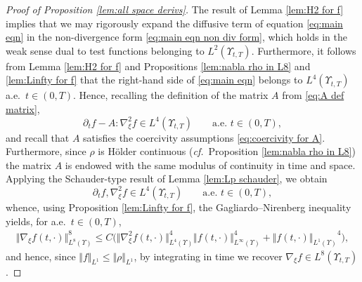 \documentclass[11pt,a4paper,reqno]{amsart}
\theoremstyle{remark}
\theoremstyle{definition}
\numberwithin{equation}{section}
\newcommand{\bxi}{\xi}
\begin{document}
\begin{proof}[Proof of Proposition \ref{lem:all space derivs}]




  The result of Lemma \ref{lem:H2 for f} implies that we may rigorously expand the diffusive term of equation \eqref{eq:main eqn} in the non-divergence form \eqref{eq:main eqn non div form}, which
    holds in the weak sense dual to test functions belonging to $L^2(\Upsilon_{t,T})$. Furthermore, it follows from Lemma \ref{lem:H2 for f} and Propositions \ref{lem:nabla rho in L8} and \ref{lem:Linfty for f} that the right-hand side of \eqref{eq:main eqn} belongs to $L^4(\Upsilon_{t,T})$ a.e.~$t \in (0,T)$. Hence, recalling the definition of the matrix $A$ from \eqref{eq:A def matrix}, 
    \begin{equation}\label{eq:avant lieberman L4}
        \partial_t f - A:\nabla^2_{\bxi} f \in L^4(\Upsilon_{t,T}) \qquad \text{a.e.~}t \in (0,T), 
    \end{equation}
    and recall that $A$ satisfies the coercivity assumptions \eqref{eq:coercivity for A}. Furthermore, since $\rho$ is H\"older continuous (\textit{cf.}~Proposition \ref{lem:nabla rho in L8}) the matrix $A$ is endowed with the same modulus of continuity in time and space. Applying the Schauder-type result of Lemma \ref{lem:Lp schauder}, we obtain 
\begin{equation*}
    \partial_t f , \nabla^2_{\bxi} f \in L^4(\Upsilon_{t,T}) \qquad \text{a.e.~}t\in(0,T), 
\end{equation*}
whence, using Proposition \ref{lem:Linfty for f}, the Gagliardo--Nirenberg inequality yields, for a.e.~$t \in (0,T)$, 
\begin{equation}\label{eq:grad f in L8}
  \begin{aligned}  \Vert \nabla_{\bxi} f(t,\cdot) \Vert_{L^8(\Upsilon)}^8 \leq C \Big( \Vert \nabla_{\bxi}^2 f(t,\cdot) \Vert_{L^4(\Upsilon)}^{4} \Vert f(t,\cdot) \Vert_{L^\infty(\Upsilon)}^{4} + {\Vert f(t,\cdot) \Vert_{L^1(\Upsilon)}}^4 \Big), 
  \end{aligned}
\end{equation}
and hence, since $\Vert f \Vert_{L^1} \leq \Vert \rho \Vert_{L^1}$, by integrating in time we recover $\nabla_{\bxi}f \in L^8(\Upsilon_{t,T})$. 

\smallskip 



\end{proof}
\end{document}
